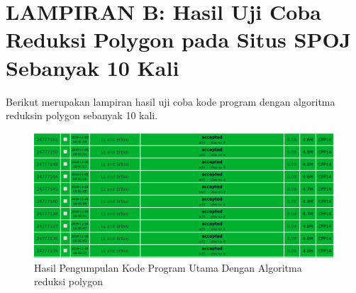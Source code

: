 \chapter{LAMPIRAN B: Hasil Uji Coba Reduksi Polygon pada Situs SPOJ Sebanyak 10 Kali}

Berikut merupakan lampiran hasil uji coba kode program dengan algoritma reduksin polygon sebanyak 10 kali.

\renewcommand{\thefigure}{C.\arabic{figure}}
\setcounter{figure}{0}

\begin{figure}[!h]
 \Centering
 \includegraphics[width=\columnwidth]{bab5/img/hasil-pengumpulan-kode-program}
 \caption{Hasil Pengumpulan Kode Program Utama Dengan Algoritma reduksi polygon}
 \label{fig:hasil-pengumpulan-kode-program}
\end{figure}